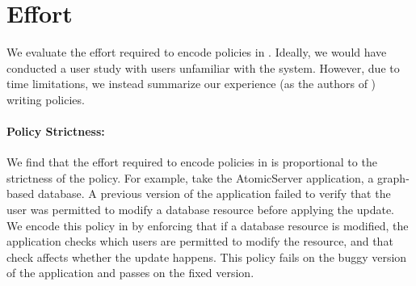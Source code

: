 \section{Effort}
\label{sec:accessibility}

We evaluate the effort required to encode policies in \syslang{}.
%
Ideally, we would have conducted a user study with users unfamiliar with the system.
%
However, due to time limitations, we instead summarize our experience (as the authors of \syslang{}) writing policies.
%

\paragraph{Policy Strictness:} We find that the effort required to encode policies in \syslang{} is proportional to the strictness of the policy.
%
For example, take the AtomicServer application, a graph-based database.
%
A previous version of the application failed to verify that the 
user was permitted to modify a database resource before applying the update.
%
%
%
%
We encode this policy in \syslang{} by enforcing that if a database resource is modified,
the application checks which users are permitted to modify the resource,
and that check affects whether the update happens.
%
This policy fails on the buggy version of the application and passes on the fixed version.

